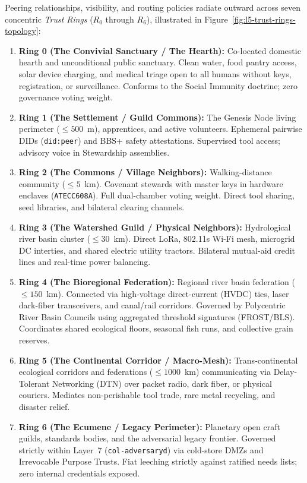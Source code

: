 Peering relationships, visibility, and routing policies radiate outward across seven concentric \textit{Trust Rings} ($R_0$ through $R_6$), illustrated in Figure~\ref{fig:l5-trust-rings-topology}:

\begin{enumerate}
  \item \textbf{Ring 0 (The Convivial Sanctuary / The Hearth):} Co-located domestic hearth and unconditional public sanctuary. Clean water, food pantry access, solar device charging, and medical triage open to all humans without keys, registration, or surveillance. Conforms to the Social Immunity doctrine; zero governance voting weight.
  \item \textbf{Ring 1 (The Settlement / Guild Commons):} The Genesis Node living perimeter ($\le 500$~m), apprentices, and active volunteers. Ephemeral pairwise DIDs (\texttt{did:peer}) and BBS+ safety attestations. Supervised tool access; advisory voice in Stewardship assemblies.
  \item \textbf{Ring 2 (The Commons / Village Neighbors):} Walking-distance community ($\le 5$~km). Covenant stewards with master keys in hardware enclaves (\texttt{ATECC608A}). Full dual-chamber voting weight. Direct tool sharing, seed libraries, and bilateral clearing channels.
  \item \textbf{Ring 3 (The Watershed Guild / Physical Neighbors):} Hydrological river basin cluster ($\le 30$~km). Direct LoRa, 802.11s Wi-Fi mesh, microgrid DC interties, and shared electric utility tractors. Bilateral mutual-aid credit lines and real-time power balancing.
  \item \textbf{Ring 4 (The Bioregional Federation):} Regional river basin federation ($\le 150$~km). Connected via high-voltage direct-current (HVDC) ties, laser dark-fiber transceivers, and canal/rail corridors. Governed by Polycentric River Basin Councils using aggregated threshold signatures (FROST/BLS). Coordinates shared ecological floors, seasonal fish runs, and collective grain reserves.
  \item \textbf{Ring 5 (The Continental Corridor / Macro-Mesh):} Trans-continental ecological corridors and federations ($\le 1000$~km) communicating via Delay-Tolerant Networking (DTN) \parencite{fall2003} over packet radio, dark fiber, or physical couriers. Mediates non-perishable tool trade, rare metal recycling, and disaster relief.
  \item \textbf{Ring 6 (The Ecumene / Legacy Perimeter):} Planetary open craft guilds, standards bodies, and the adversarial legacy frontier. Governed strictly within Layer~7 (\texttt{col-adversaryd}) via cold-store DMZs and Irrevocable Purpose Trusts. Fiat leeching strictly against ratified needs lists; zero internal credentials exposed.
\end{enumerate}

